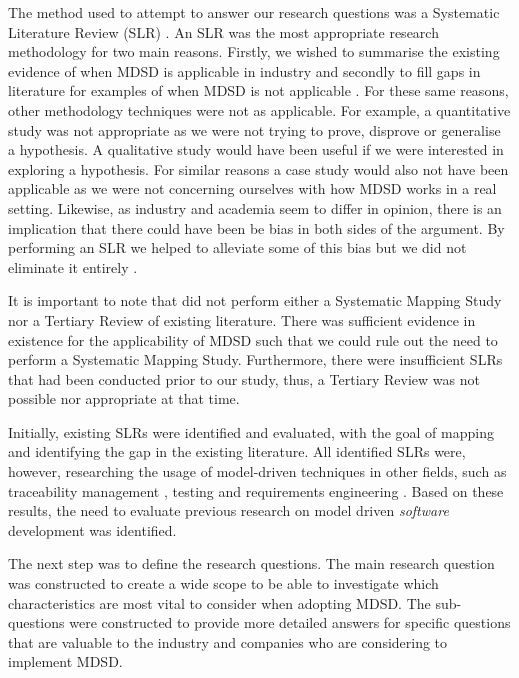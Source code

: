 \documentclass[10pt,twocolumn]{article}
\begin{document}
The method used to attempt to answer our research questions was a Systematic Literature Review (SLR) \cite{keele2007guidelines}. An SLR was the most appropriate research methodology for two main reasons. Firstly, we wished to summarise the existing evidence of when MDSD is applicable in industry and secondly to fill gaps in literature for examples of when MDSD is not applicable \cite{keele2007guidelines}. For these same reasons, other methodology techniques were not as applicable. For example, a quantitative study was not appropriate as we were not trying to prove, disprove or generalise a hypothesis. A qualitative study would have been useful if we were interested in exploring a hypothesis. For similar reasons a case study would also not have been applicable as we were not concerning ourselves with how MDSD works in a real setting. Likewise, as industry and academia seem to differ in opinion, there is an implication that there could have been be bias in both sides of the argument. By performing an SLR we helped to alleviate some of this bias but we did not eliminate it entirely \cite{keele2007guidelines}.

It is important to note that did not perform either a Systematic Mapping Study nor a Tertiary Review of existing literature. There was sufficient evidence in existence for the applicability of MDSD such that we could rule out the need to perform a Systematic Mapping Study. Furthermore, there were insufficient SLRs that had been conducted prior to our study, thus, a Tertiary Review was not possible nor appropriate at that time.


Initially, existing SLRs were identified and evaluated, with the goal of mapping and identifying the gap in the existing literature. All identified SLRs \cite{santiago2012model} \cite{dias2007survey} \cite{loniewski2010systematic} \cite{nicolas2009generation} were, however, researching the usage of model-driven techniques in other fields, such as traceability management \cite{santiago2012model}, testing \cite{dias2007survey} and requirements engineering \cite{loniewski2010systematic} \cite{nicolas2009generation}. Based on these results, the need to evaluate previous research on model driven \textit{software} development was identified. 

The next step was to define the research questions. The main research question was constructed to create a wide scope to be able to investigate which characteristics are most vital to consider when adopting MDSD. The sub-questions were constructed to provide more detailed answers for specific questions that are valuable to the industry and companies who are considering to implement MDSD. 
\end{document}
